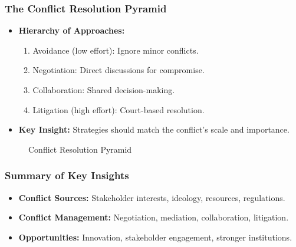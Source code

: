 \documentclass[10pt]{beamer}
\begin{document}
            \begin{frame}
                \frametitle{The Conflict Resolution Pyramid}
                \begin{itemize}
                    \item \textbf{Hierarchy of Approaches:}
                        \begin{enumerate}
                            \item Avoidance (low effort): Ignore minor conflicts.
                            \item Negotiation: Direct discussions for compromise.
                            \item Collaboration: Shared decision-making.
                            \item Litigation (high effort): Court-based resolution.
                        \end{enumerate}
                    \item \textbf{Key Insight:} Strategies should match the conflict's scale and importance.
                \end{itemize}
                
                   \begin{figure}
                        \centering
                        \caption{Conflict Resolution Pyramid}
                    \end{figure}      
                \end{frame}
            
            \begin{frame}
            \frametitle{Summary of Key Insights}
            \begin{itemize}
                \item \textbf{Conflict Sources:} Stakeholder interests, ideology, resources, regulations.
                \item \textbf{Conflict Management:} Negotiation, mediation, collaboration, litigation.
                \item \textbf{Opportunities:} Innovation, stakeholder engagement, stronger institutions.
            \end{itemize}
            \end{frame}
            
\end{document}
